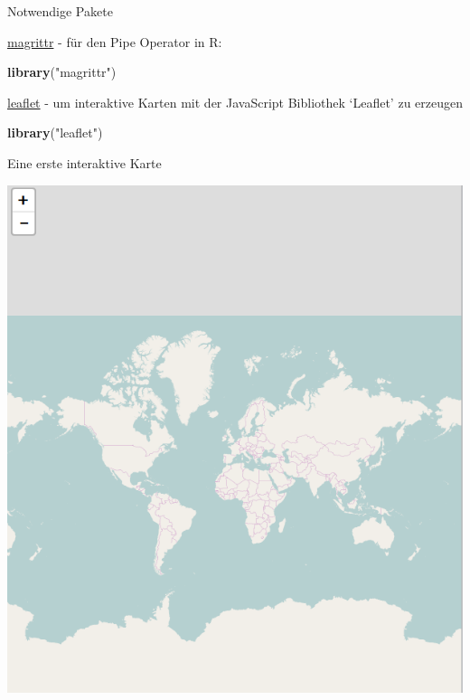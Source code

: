 \documentclass[ignorenonframetext,]{beamer}
\newenvironment{Shaded}{\begin{snugshade}}{\end{snugshade}}
\newcommand{\KeywordTok}[1]{\textcolor[rgb]{0.13,0.29,0.53}{\textbf{#1}}}
\newcommand{\StringTok}[1]{\textcolor[rgb]{0.31,0.60,0.02}{#1}}
\newcommand{\OperatorTok}[1]{\textcolor[rgb]{0.81,0.36,0.00}{\textbf{#1}}}
\newcommand{\NormalTok}[1]{#1}
\begin{document}
\begin{frame}[fragile]{Notwendige Pakete}

\href{https://cran.r-project.org/web/packages/magrittr/index.html}{magrittr}
- für den Pipe Operator in R:

\begin{Shaded}
\begin{Highlighting}[]
\KeywordTok{library}\NormalTok{(}\StringTok{"magrittr"}\NormalTok{)}
\end{Highlighting}
\end{Shaded}

\href{https://rstudio.github.io/leaflet/}{leaflet} - um interaktive
Karten mit der JavaScript Bibliothek `Leaflet' zu erzeugen

\begin{Shaded}
\begin{Highlighting}[]
\KeywordTok{library}\NormalTok{(}\StringTok{"leaflet"}\NormalTok{)}
\end{Highlighting}
\end{Shaded}

\end{frame}

\begin{frame}[fragile]{Eine erste interaktive Karte}

\begin{Shaded}
\end{Shaded}

\includegraphics{figure/FirstLeaflet.PNG}

\end{frame}
\end{document}
